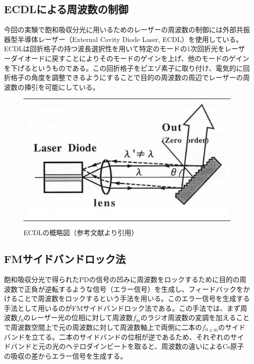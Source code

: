 \documentclass[uplatex, dvipdfmx, a4paper, report, papersize, 11pt]{jsbook}
\begin{document}
\subsection{ECDLによる周波数の制御}
今回の実験で飽和吸収分光に用いるためのレーザーの周波数の制御には外部共振器型半導体レーザー（External Cavity Diode Laser, ECDL）を使用している。ECDLは回折格子の持つ波長選択性を用いて特定のモードの1次回折光をレーザーダイオードに戻すことによりそのモードのゲインを上げ、他のモードのゲインを下げるというものである。この回折格子をピエゾ素子に取り付け、電気的に回折格子の角度を調整できるようにすることで目的の周波数の周辺でレーザーの周波数の挿引を可能にしている。

\begin{figure}[htpb]
  \centering
    \begin{tabular}{c}
      \begin{minipage}{1\hsize}
        \centering
          \includegraphics[keepaspectratio,  scale=0.35,  angle=0]
                          {figures/saturated-absorption/ECDL_diagram.png}
                          \caption{ECDLの概略図（参考文献\cite{ECDL}より引用）}
                          \label{ECDL_diagram}
      \end{minipage}
    \end{tabular}
\end{figure}
\subsection{FMサイドバンドロック法}
飽和吸収分光で得られたPDの信号の凹みに周波数をロックするために目的の周波数で正負が逆転するような信号（エラー信号）を生成し、フィードバックをかけることで周波数をロックするという手法を用いる。このエラー信号を生成する手法として用いるのがFMサイドバンドロック法である。この手法では、まず周波数$f_\mathrm{0}$のレーザー光の位相に対して周波数$f_\mathrm{m}$のラジオ周波数の変調を加えることで周波数空間上で元の周波数に対して周波数軸上で両側に二本の$f_\mathrm{0\pm m}$のサイドバンドを立てる。二本のサイドバンドの位相が逆であるため、それぞれのサイドバンドと元の光のヘテロダインビートを取ると、周波数の違いによるCs原子の吸収の差からエラー信号を生成する。
\end{document}
